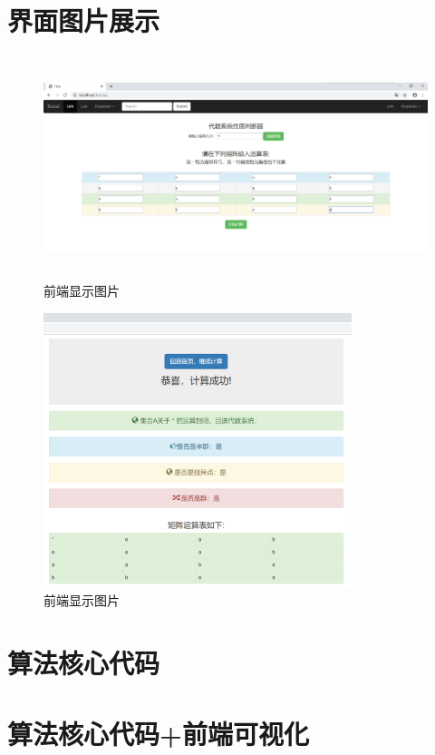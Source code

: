 \documentclass{article}
\begin{document}
\section{界面图片展示}
\begin{figure}
    \centering
    \includegraphics[width=14.7cm,height=6.5cm]{1.png}
    \caption{前端显示图片}
\end{figure}
\begin{figure}
    \centering
    \includegraphics[width=9cm,height=8cm]{2.png}
    \caption{前端显示图片}
\end{figure}
\section{算法核心代码}

\section{算法核心代码+前端可视化}

\end{document}

